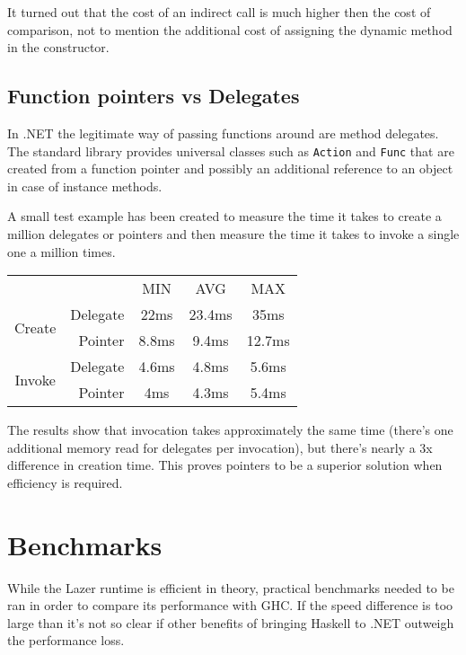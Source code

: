 \documentclass[en]{pracamgr}
\begin{document}
It turned out that the cost of an indirect call is much higher then the cost of comparison, not to mention the additional cost of assigning the dynamic method in the constructor.

\subsection{Function pointers vs Delegates}\label{perf:fun_pointers}

In .NET the legitimate way of passing functions around
are method delegates. The standard library provides
universal classes such as \texttt{Action} and \texttt{Func}
that are created from a function pointer and possibly
an additional reference to an object in case of instance methods.

A small test example has been created to measure the time
it takes to create a million delegates or pointers and then
measure the time it takes to invoke a single one a million times.

\begin{center}
\begin{tabular}{c r c c c}
    & & MIN & AVG & MAX \\
    \cline{3-5}

    \multirow{2}{*}{Create}
    & Delegate & 22ms & 23.4ms & 35ms \\
    & Pointer & 8.8ms & 9.4ms & 12.7ms \\
    \cline{2-5}
    
    \multirow{2}{*}{Invoke}
    & Delegate & 4.6ms & 4.8ms & 5.6ms \\
    & Pointer & 4ms & 4.3ms & 5.4ms \\
\end{tabular}
\end{center}

The results show that invocation takes approximately the same time
(there's one additional memory read for delegates per invocation),
but there's nearly a 3x difference in creation time.
This proves pointers to be a superior solution
when efficiency is required.

\section{Benchmarks}\label{s:benchmarks}

While the Lazer runtime is efficient in theory,
practical benchmarks needed to be ran in order to
compare its performance with GHC. If the speed difference
is too large than it's not so clear if other benefits
of bringing Haskell to .NET outweigh the performance loss.
\end{document}
